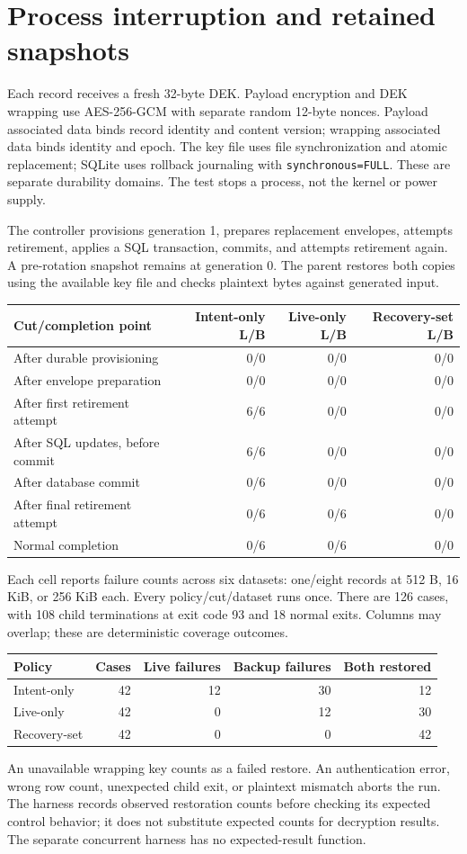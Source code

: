\documentclass[10pt]{article}
\begin{document}
\newpage
\section{Process interruption and retained snapshots}
Each record receives a fresh 32-byte DEK. Payload encryption and DEK wrapping
use AES-256-GCM with separate random 12-byte nonces. Payload associated data binds
record identity and content version; wrapping associated data binds identity
and epoch. The key file uses file synchronization and atomic replacement;
SQLite uses rollback journaling with \texttt{synchronous=FULL}. These are separate
durability domains. The test stops a process, not the kernel or power supply.

The controller provisions generation 1, prepares replacement envelopes, attempts
retirement, applies a SQL transaction, commits, and attempts retirement again.
A pre-rotation snapshot remains at generation 0. The parent restores both copies
using the available key file and checks plaintext bytes against generated input.
\begin{center}\begin{tabular}{@{}p{6.7cm}rrr@{}}
\toprule
Cut/completion point & Intent-only L/B & Live-only L/B & Recovery-set L/B\\
\midrule
After durable provisioning & 0/0 & 0/0 & 0/0\\
After envelope preparation & 0/0 & 0/0 & 0/0\\
After first retirement attempt & 6/6 & 0/0 & 0/0\\
After SQL updates, before commit & 6/6 & 0/0 & 0/0\\
After database commit & 0/6 & 0/0 & 0/0\\
After final retirement attempt & 0/6 & 0/6 & 0/0\\
Normal completion & 0/6 & 0/6 & 0/0\\
\bottomrule\end{tabular}\end{center}
Each cell reports failure counts across six datasets: one/eight records at
512 B, 16 KiB, or 256 KiB each. Every policy/cut/dataset runs once. There are
126 cases, with 108 child terminations at exit code 93 and 18 normal exits.
Columns may overlap; these are deterministic coverage outcomes.

\begin{center}\begin{tabular}{@{}lrrrr@{}}
\toprule
Policy & Cases & Live failures & Backup failures & Both restored\\
\midrule
Intent-only & 42 & 12 & 30 & 12\\
Live-only & 42 & 0 & 12 & 30\\
Recovery-set & 42 & 0 & 0 & 42\\
\bottomrule\end{tabular}\end{center}
An unavailable wrapping key counts as a failed restore. An authentication error,
wrong row count, unexpected child exit, or plaintext mismatch aborts the run.
The harness records observed restoration counts before checking its expected
control behavior; it does not substitute expected counts for decryption results.
The separate concurrent harness has no expected-result function.
\end{document}
